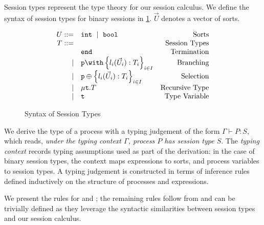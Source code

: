 {Session types} represent the type theory for our session calculus.
We define the syntax of session types for binary sessions in
\cref{fig:bst}. $\vec U$ denotes a vector of sorts.

\begin{figure}[!hb]
\doublespacing
\[
\begin{array}{rlr}

U ::= & \text{\tt{int}}~\mid~\text{\tt{bool}} & \text{Sorts} \\

T ::= & & \text{Session Types} \\
     & \tend & \text{Termination} \\
\mid & \tbra{p}{l_i(\vec U_i):T_i}{i\in I} & \text{Branching} \\
\mid & \tsel{p}{l_i(\vec U_i):T_i}{i\in I} & \text{Selection} \\
\mid & \trec{T} & \text{Recursive Type} \\
\mid & \trecvar & \text{Type Variable} \\
\end{array}
\]

\singlespacing
\caption{Syntax of Session Types}
\label{fig:bst}
\end{figure}

We derive the type of a process with a {typing judgement} 
of the form $\Gamma \vdash P: S$, which reads, 
\textit{under the typing context $\Gamma$, 
process $P$ has session type $S$}. 
The \textit{typing context} records typing assumptions 
used as part of the derivation: in the case of binary session types, 
the context maps expressions to sorts, 
and process variables to session types. 
A typing judgement is constructed in terms of inference rules 
defined inductively on the structure of 
processes and expressions.

We present the rules for  and ; 
the remaining rules follow from \cite{C406Lecture} 
and can be trivially defined as 
they leverage the syntactic similarities between 
session types and our session calculus.

\begin{prooftree}
\end{prooftree}

\begin{prooftree}
\end{prooftree}

